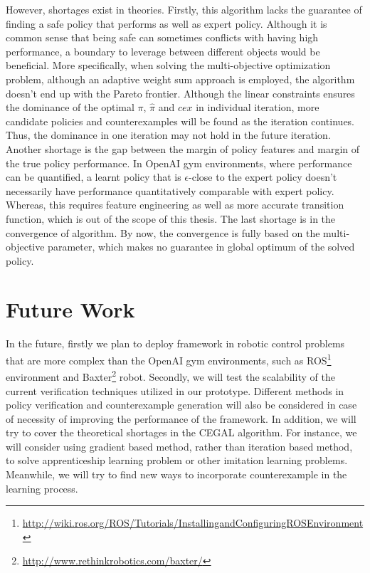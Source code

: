 However, shortages exist in theories. Firstly, this algorithm lacks the guarantee of finding a safe policy that performs as well as expert policy. Although it is common sense that being safe can sometimes conflicts with having high performance, a boundary to leverage between different objects would be beneficial. More specifically, when solving the multi-objective optimization problem, although an adaptive weight sum approach is employed, the algorithm doesn't end up with the Pareto frontier. Although the linear constraints ensures the dominance of the optimal $\pi$, $\hat{\pi}$ and $cex$ in individual iteration, more candidate policies and counterexamples will be found as the iteration continues. Thus, the dominance in one iteration may not hold in the future iteration. Another shortage is the gap between the margin of policy features and margin of the true policy performance. In OpenAI gym environments, where performance can be quantified, a learnt policy that is {$\epsilon$-close} to the expert policy doesn't necessarily have performance quantitatively comparable with expert policy. Whereas, this requires feature engineering as well as more accurate transition function, which is out of the scope of this thesis. The last shortage is in the convergence of algorithm. By now, the convergence is fully based on the multi-objective parameter, which makes no guarantee in global optimum of the solved policy.

\section{Future Work}
In the future, firstly we plan to deploy framework in robotic control problems that are more complex than the OpenAI gym environments, such as ROS\footnote{\url{http://wiki.ros.org/ROS/Tutorials/InstallingandConfiguringROSEnvironment}} environment and Baxter\footnote{\url{http://www.rethinkrobotics.com/baxter/}} robot. Secondly, we will test the scalability of the current verification techniques utilized in our prototype. Different methods in policy verification and counterexample generation will also be considered in case of necessity of improving the performance of the framework. In addition, we will try to cover the theoretical shortages in the CEGAL algorithm. For instance, we will consider using gradient based method, rather than iteration based method, to solve apprenticeship learning problem or other imitation learning problems. Meanwhile, we will try to find new ways to incorporate counterexample in the learning process.